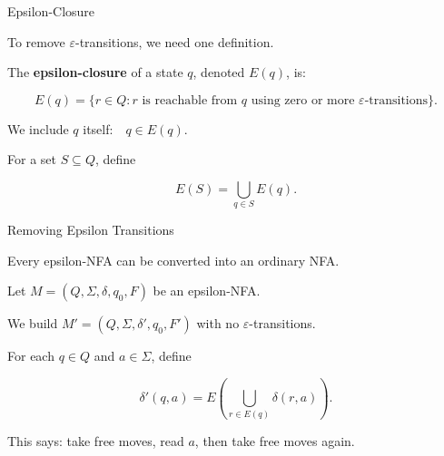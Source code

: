 \documentclass[10pt,aspectratio=169]{beamer}
\newcommand{\eps}{\varepsilon}
\begin{document}
\begin{frame}{Epsilon-Closure}

To remove \(\eps\)-transitions, we need one definition.

\vspace{0.8em}

The \textbf{epsilon-closure} of a state \(q\), denoted \(E(q)\), is:

\[
E(q)=\{r\in Q: r\text{ is reachable from }q\text{ using zero or more }\eps\text{-transitions}\}.
\]

\vspace{0.8em}

We include \(q\) itself:\(\quad
q\in E(q).
\)

\vspace{0.8em}

For a set \(S\subseteq Q\), define

\[
E(S)=\bigcup_{q\in S}E(q).
\]

\end{frame}

\begin{frame}{Removing Epsilon Transitions}

Every epsilon-NFA can be converted into an ordinary NFA.

\vspace{0.8em}

Let \(
M=(Q,\Sigma,\delta,q_0,F)
\) be an epsilon-NFA. 

We build \(
M'=(Q,\Sigma,\delta',q_0,F')
\) with no \(\eps\)-transitions.

\vspace{0.8em}

For each \(q\in Q\) and \(a\in\Sigma\), define

\[
\delta'(q,a)
=
E\left(\bigcup_{r\in E(q)}\delta(r,a)\right).
\]

\vspace{0.5em}

This says: take free moves, read \(a\), then take free moves again.

\end{frame}
\end{document}
